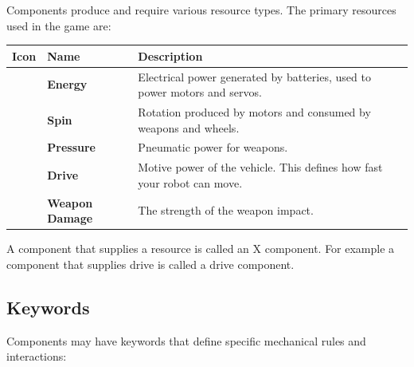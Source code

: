 \documentclass[11pt,a4paper]{article}
\newcommand{\inlineIcon}[1]{\raisebox{-0.22ex}{\resizebox{!}{1.15em}{#1}}}
\begin{document}
Components produce and require various resource types. The primary resources used in the game are:

\begin{center}
\renewcommand{\arraystretch}{1.15}
\begin{tabularx}{\textwidth}{c l X}
  \toprule
  \textbf{Icon} & \textbf{Name} & \textbf{Description} \\
  \midrule
  \inlineIcon{\resourceE} & \textbf{Energy}   & Electrical power generated by batteries, used to power motors and servos. \\
  \inlineIcon{\resourceS} & \textbf{Spin}     & Rotation produced by motors and consumed by weapons and wheels. \\
  \inlineIcon{\resourceP} & \textbf{Pressure} & Pneumatic power for weapons. \\
  \inlineIcon{\resourceM} & \textbf{Drive} \inlineIcon{\resourceM}    & Motive power of the vehicle. This defines how fast your robot can move. \\
  \inlineIcon{\resourceW} & \textbf{Weapon Damage} \inlineIcon{\resourceW}   & The strength of the weapon impact. \\
  \bottomrule
\end{tabularx}
\end{center}

A component that supplies a resource is called an X component. For example a component that supplies drive is called 
a drive component.

\subsection{Keywords}

Components may have keywords that define specific mechanical rules and interactions:
\end{document}
